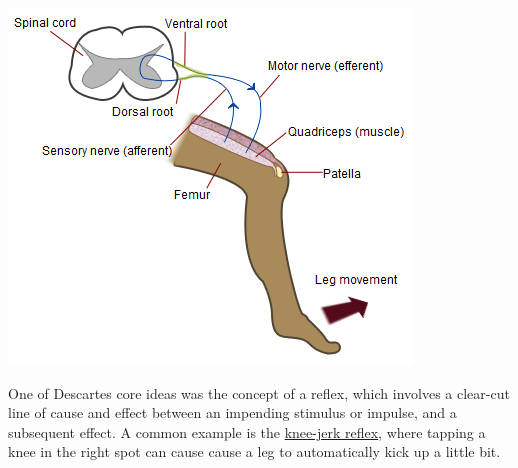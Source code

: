 \documentclass[
  oneside,
  12pt]{crumpbook}
\newenvironment{floatright25}{%
  \wrapfigure{R}{.25\textwidth}%
  }{%
  \endwrapfigure}
\begin{document}
\begin{floatright25}
\includegraphics[width=1\linewidth]{imgs/Patellar-knee-reflex}

\end{floatright25}

One of Descartes core ideas was the concept of a reflex, which involves a clear-cut line of cause and effect between an impending stimulus or impulse, and a subsequent effect. A common example is the \href{https://en.wikipedia.org/wiki/Patellar_reflex}{knee-jerk reflex}, where tapping a knee in the right spot can cause cause a leg to automatically kick up a little bit.
\end{document}
